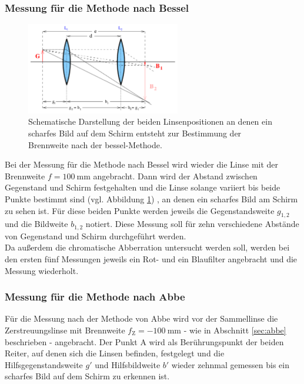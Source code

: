 \subsubsection{Messung für die Methode nach Bessel}
\begin{figure}
  \centering
  \includegraphics[width=0.6\textwidth]{Bilder/Bessel.png}
  \caption{Schematische Darstellung der beiden Linsenpositionen an denen ein scharfes Bild auf dem Schirm entsteht zur Bestimmung der Brennweite nach der bessel-Methode.}
  \label{fig:besselmess}
\end{figure}
Bei der Messung für die Methode nach Bessel wird wieder die Linse mit der Brennweite
$f=\SI{100}{\milli\meter}$ angebracht.
Dann wird der Abstand zwischen Gegenstand und Schirm festgehalten und die Linse solange variiert
bis beide Punkte bestimmt sind (vgl. Abbildung \ref{fig:besselmess}) , an denen ein scharfes Bild am Schirm zu sehen ist.
Für diese beiden Punkte werden jeweils die Gegenstandsweite $g_{1,2}$ und die Bildweite
$b_{1,2}$ notiert. Diese Messung soll für zehn verschiedene Abstände von Gegenstand und Schirm
durchgeführt werden.\\
Da außerdem die chromatische Abberration untersucht werden soll, werden bei den ersten fünf
Messungen jeweils ein Rot- und ein Blaufilter angebracht und die Messung wiederholt.

\subsubsection{Messung für die Methode nach Abbe}

Für die Messung nach der Methode von Abbe wird vor der Sammellinse die Zerstreuungslinse mit
Brennweite $f_{\mathrm{Z}}=-\SI{100}{\milli\meter}$ - wie in Abschnitt \ref{sec:abbe}
beschrieben - angebracht. Der Punkt A wird als Berührungspunkt der beiden Reiter, auf denen
sich die Linsen befinden, festgelegt und die Hilfsgegenstandsweite $g'$  und Hilfsbildweite $b'$ wieder zehnmal
gemessen bis ein scharfes Bild auf dem Schirm zu erkennen ist.
